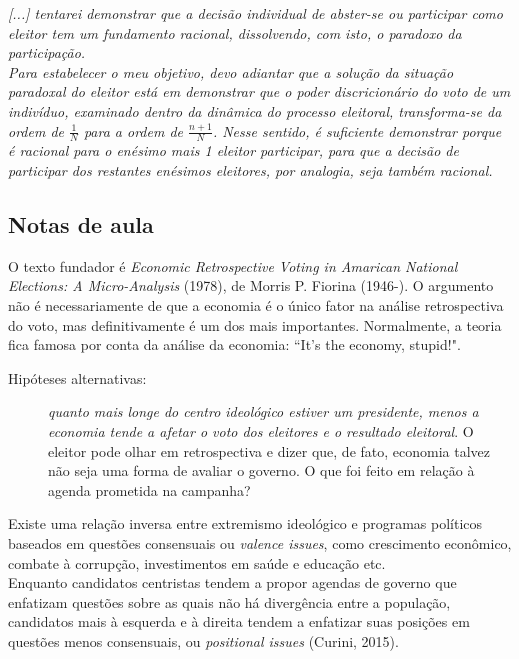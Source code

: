 \noindent \textit{[...] tentarei demonstrar que a decisão individual de abster-se ou participar como eleitor tem um fundamento racional, dissolvendo, com isto, o paradoxo da participação.} \cite[~p. 214]{marcus_figueiredo} \\

\noindent \textit{Para estabelecer o meu objetivo, devo adiantar que a solução da situação paradoxal do eleitor está em demonstrar que o poder discricionário do voto de um indivíduo, examinado dentro da dinâmica do processo eleitoral, transforma-se da ordem de $\frac{1}{N}$ para a ordem de $\frac{n+1}{N}$. Nesse sentido, é suficiente demonstrar porque é racional para o enésimo mais 1 eleitor participar, para que a decisão de participar dos restantes enésimos eleitores, por analogia, seja também racional.} \cite[~p. 215]{marcus_figueiredo}

\subsection{Notas de aula}

O texto fundador é \textit{Economic Retrospective Voting in Amarican National Elections: A Micro-Analysis} (1978), de Morris P. Fiorina (1946-). O argumento não é necessariamente de que a economia é o único fator na análise retrospectiva do voto, mas definitivamente é um dos mais importantes. Normalmente, a teoria fica famosa por conta da análise da economia: ``It's the economy, stupid!". 

\begin{description}
    \item [Hipóteses alternativas:] \textit{quanto mais longe do centro ideológico estiver um presidente, menos a economia tende a afetar o voto dos eleitores e o resultado eleitoral}. O eleitor pode olhar em retrospectiva e dizer que, de fato, economia talvez não seja uma forma de avaliar o governo. O que foi feito em relação à agenda prometida na campanha?
\end{description}

\noindent Existe uma relação inversa entre extremismo ideológico e programas políticos baseados em questões consensuais ou \textit{valence issues}, como crescimento econômico, combate à corrupção, investimentos em saúde e educação etc. \\

\noindent Enquanto candidatos centristas tendem a propor agendas de governo que enfatizam questões sobre as quais não há divergência entre a população, candidatos mais à esquerda e à direita tendem a enfatizar suas posições em questões menos consensuais, ou \textit{positional issues} (Curini, 2015). \\

